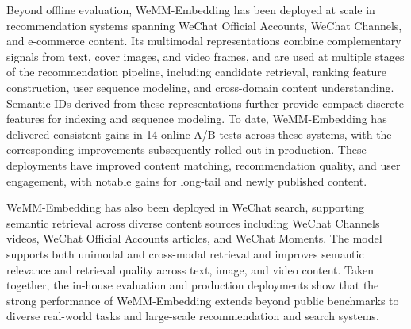 \documentclass[]{wechat}
\begin{document}
\begin{table}[htbp]
\centering
\small
\setlength{\tabcolsep}{5.7pt}
\renewcommand{\arraystretch}{1.06}
\caption{Evaluation results on the in-house benchmark. AVG denotes the average over all 26 tasks. Cross-DM denotes cross-domain content matching; Article Rel. denotes article relevance; Video Rel. denotes video relevance.}
\label{tab:business}
\end{table}

Beyond offline evaluation, WeMM-Embedding has been deployed at scale in recommendation systems spanning WeChat Official Accounts, WeChat Channels, and e-commerce content. Its multimodal representations combine complementary signals from text, cover images, and video frames, and are used at multiple stages of the recommendation pipeline, including candidate retrieval, ranking feature construction, user sequence modeling, and cross-domain content understanding. Semantic IDs derived from these representations further provide compact discrete features for indexing and sequence modeling. To date, WeMM-Embedding has delivered consistent gains in 14 online A/B tests across these systems, with the corresponding improvements subsequently rolled out in production. These deployments have improved content matching, recommendation quality, and user engagement, with notable gains for long-tail and newly published content.

WeMM-Embedding has also been deployed in WeChat search, supporting semantic retrieval across diverse content sources including WeChat Channels videos, WeChat Official Accounts articles, and WeChat Moments. The model supports both unimodal and cross-modal retrieval and improves semantic relevance and retrieval quality across text, image, and video content. Taken together, the in-house evaluation and production deployments show that the strong performance of WeMM-Embedding extends beyond public benchmarks to diverse real-world tasks and large-scale recommendation and search systems.
\end{document}
